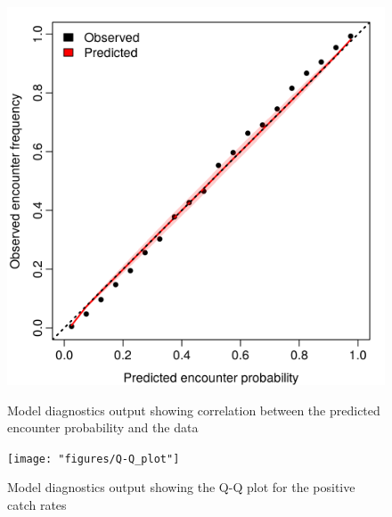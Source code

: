 \documentclass{article}
\begin{document}
\begin{figure}[!ht]
\begin{center}
	\includegraphics[width = 0.9\linewidth]{"figures/Diag--Encounter_prob"}
	\label{fig:S12}
	\caption{Model diagnostics output showing correlation between the
		predicted encounter probability and the data}
	\end{center}
\end{figure}

\begin{figure}[!ht]
\begin{center}
	\texttt{[image: "figures/Q-Q\_plot"]}
	\label{fig:S13}
	\caption{Model diagnostics output showing the Q-Q plot for the positive
	catch rates}
	\end{center}
\end{figure}
\end{document}
